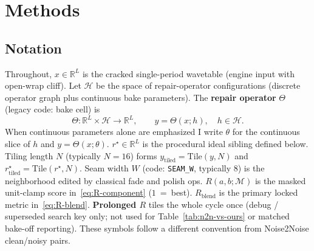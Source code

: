 \section{Methods}
\label{sec:methods}

\subsection{Notation}
\label{sec:notation}

Throughout, $x\in\mathbb{R}^{L}$ is the cracked single-period wavetable (engine input with open-wrap cliff).
Let $\mathcal{H}$ be the space of repair-operator configurations (discrete operator graph plus continuous bake parameters).
The \textbf{repair operator} $\Theta$ (legacy code: bake cell) is
\begin{equation}
\label{eq:Theta}
\Theta:\mathbb{R}^{L}\times\mathcal{H}\to\mathbb{R}^{L},\qquad
y=\Theta(x;h),\quad h\in\mathcal{H}.
\end{equation}
When continuous parameters alone are emphasized I write $\theta$ for the continuous slice of $h$ and $y=\Theta(x;\theta)$.
$r^{\star}\in\mathbb{R}^{L}$ is the procedural ideal sibling defined below.
Tiling length $N$ (typically $N{=}16$) forms $y_{\mathrm{tiled}}=\mathrm{Tile}(y,N)$ and $r^{\star}_{\mathrm{tiled}}=\mathrm{Tile}(r^{\star},N)$.
Seam width $W$ (code: \texttt{SEAM\_W}, typically $8$) is the neighborhood edited by classical fade and polish ops.
$R(a,b;\mathcal{M})$ is the masked unit-clamp score in~\eqref{eq:R-component} ($1$~=~best).
$R_{\mathrm{blend}}$ is the primary locked metric in~\eqref{eq:R-blend}.
\textbf{Prolonged $R$} tiles the whole cycle once (debug / superseded search key only; not used for Table~\ref{tab:n2n-vs-ours} or matched bake-off reporting).
These symbols follow a different convention from Noise2Noise clean/noisy pairs.

